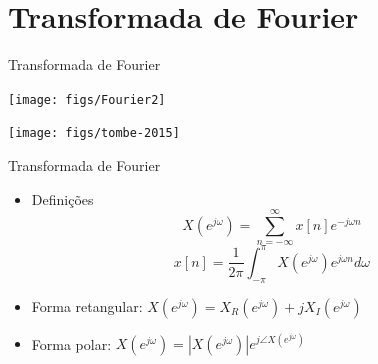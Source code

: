\section[slide=true]{Transformada de Fourier}
\begin{slide}[toc=]{Transformada de Fourier}
		{
			\texttt{[image: figs/Fourier2]}\pause
		\begin{center}
			\texttt{[image: figs/tombe-2015]}
		\end{center}
		}
\end{slide}

\begin{slide}[toc=]{Transformada de Fourier}
 \begin{itemize}
  \item Defini\c c\~oes
     \begin{equation*} X(e^{j\omega})=\sum_{n=-\infty}^{\infty} x[n]e^{-j\omega n}  \end{equation*}
     \begin{equation*} x[n]=\frac{1}{2\pi}\int_{-\pi}^{\pi} X(e^{j\omega})e^{j\omega n} d\omega \end{equation*}
   \item Forma retangular: $X(e^{j\omega}) = X_R(e^{j\omega}) + j X_I(e^{j\omega})$
   \item Forma polar: $X(e^{j\omega}) = |X(e^{j\omega})|e^{j\angle X(e^{j\omega})}$
 \end{itemize}
\end{slide}

